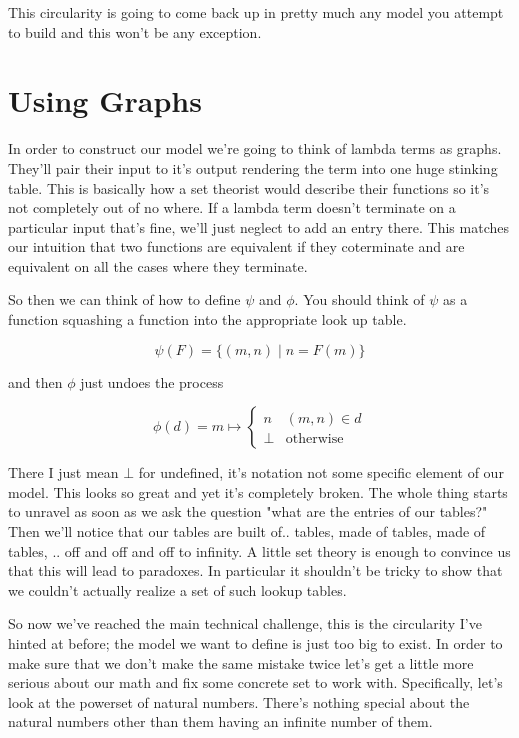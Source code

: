 \documentclass{amsart}
\begin{document}
This circularity is going to come back up in pretty much any model you
attempt to build and this won't be any exception.

\section{Using Graphs}

In order to construct our model we're going to think of lambda terms
as graphs. They'll pair their input to it's output rendering the term
into one huge stinking table. This is basically how a set theorist
would describe their functions so it's not completely out of no
where. If a lambda term doesn't terminate on a particular input that's
fine, we'll just neglect to add an entry there. This matches our
intuition that two functions are equivalent if they coterminate and
are equivalent on all the cases where they terminate.

So then we can think of how to define $\psi$ and $\phi$.
You should think of $\psi$ as a function squashing a
function into the appropriate look up table.

\[
  \psi(F) = \{(m, n) \mid n = F(m)\}
\]

and then $\phi$ just undoes the process

\[
  \phi(d) = m \mapsto
   \begin{cases}
      n & (m, n) \in d\\
      \bot & \text{otherwise}
   \end{cases}
\]

There I just mean $\bot$ for undefined, it's notation not some
specific element of our model. This looks so great and yet it's
completely broken. The whole thing starts to unravel as soon as we
ask the question "what are the entries of our tables?" Then we'll
notice that our tables are built of.. tables, made of tables, made of
tables, .. off and off and off to infinity. A little set theory is
enough to convince us that this will lead to paradoxes. In particular
it shouldn't be tricky to show that we couldn't actually realize a set
of such lookup tables.

So now we've reached the main technical challenge, this is the
circularity I've hinted at before; the model we want to define is just
too big to exist. In order to make sure that we don't make the same
mistake twice let's get a little more serious about our math and fix
some concrete set to work with. Specifically, let's look at the
powerset of natural numbers. There's nothing special about the natural
numbers other than them having an infinite number of them.
\end{document}
